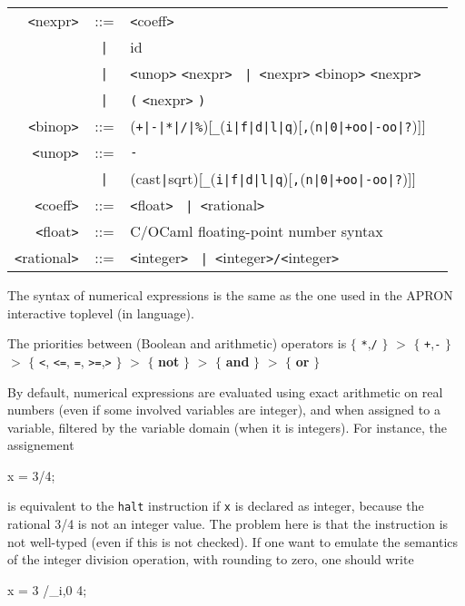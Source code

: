 \documentclass[a4paper,11pt]{article}
\newcommand{\pkw}[1]{\textcolor{progkeyword}{#1}}
\newcommand{\sx}[1]{\textcolor{prog}{\texttt{<}#1\texttt{>}}}
\newcommand{\kw}[1]{\textcolor{progkeyword}{\textbf{#1}}}
\newcommand{\tk}[1]{\textcolor{token}{\texttt{#1}}}
\newcommand{\sor}{\texttt{~|~}}
\newenvironment{syntax}
{
\T\medskip
\begin{tabular}{rcll}
}
{
\end{tabular}
\T\par\medskip
}
\newenvironment{prog}
{\begin{example}\color{prog}}
{\end{example}\par}
\newcommand{\ocaml}{\xlink{OCaml}{http://www.caml.org}\xspace}
\begin{document}
\begin{syntax}
  \sx{nexpr} &::=& \sx{coeff} \\
  &\sor& id \\
  &\sor& \sx{unop} \sx{nexpr} \sor \sx{nexpr} \sx{binop} \sx{nexpr} \\
  &\sor& \tk{(} \sx{nexpr} \tk{)} \\
  \sx{binop} &::=& (\tk{+}\texttt{|}\tk{-}\texttt{|}\tk{*}\texttt{|}\tk{/}\texttt{|}\tk{\%})[\tk{\_}(\tk{i}\texttt{|}\tk{f}\texttt{|}\tk{d}\texttt{|}\tk{l}\texttt{|}\tk{q})[\tk{,}(\tk{n}\texttt{|}\tk{0}\texttt{|}\tk{+oo}\texttt{|}\tk{-oo}\texttt{|}\tk{?})]] \\
  \sx{unop} &::=& \tk{-} \\
  &\sor& (\pkw{cast}\texttt{|}\pkw{sqrt})[\tk{\_}(\tk{i}\texttt{|}\tk{f}\texttt{|}\tk{d}\texttt{|}\tk{l}\texttt{|}\tk{q})[\tk{,}(\tk{n}\texttt{|}\tk{0}\texttt{|}\tk{+oo}\texttt{|}\tk{-oo}\texttt{|}\tk{?})]] \\
  \sx{coeff} &::=& \sx{float} \sor \sx{rational} \\
  \sx{float} &::=& C/OCaml floating-point number syntax \\
  \sx{rational} &::=& \sx{integer} \sor \sx{integer}\tk{/}\sx{integer}
\end{syntax}
The syntax of numerical expressions is the same as the one used in
the APRON interactive toplevel (in \ocaml language).

The priorities between (Boolean and arithmetic) operators is
$\{$ \tk{*},\tk{/} $\}$
\textcolor{prog}{$>$} $\{$ \tk{+},\tk{-} $\}$
\textcolor{prog}{$>$} $\{$ \tk{<}, \tk{<=}, \tk{=}, \tk{>=},\tk{>} $\}$
\textcolor{prog}{$>$} $\{$ \kw{not} $\}$
\textcolor{prog}{$>$} $\{$ \kw{and} $\}$
\textcolor{prog}{$>$} $\{$ \kw{or} $\}$

By default, numerical expressions are evaluated using exact
arithmetic on real numbers (even if some involved variables are
integer), and when assigned to a variable, filtered by the
variable domain (when it is integers). For instance, the
assignement
\begin{prog}
  x = 3/4;
\end{prog}
\noindent is equivalent to the \texttt{halt} instruction if
\texttt{x} is declared as integer, because the rational 3/4 is not
an integer value. The problem here is that the instruction is not
well-typed (even if this is not checked). If one want to emulate
the semantics of the integer division operation, with rounding to
zero, one should write
\begin{prog}
  x = 3 /_i,0 4;
\end{prog}
\end{document}
